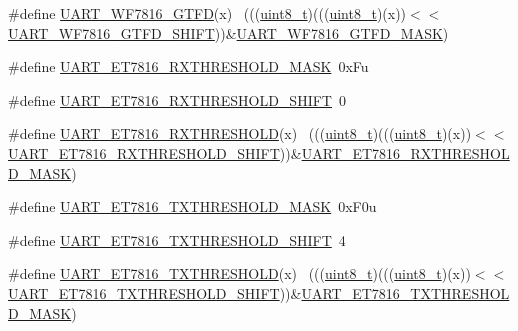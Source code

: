 \begin{DoxyCompactItemize}
\item 
\#define \hyperlink{group___u_a_r_t___register___masks_ga218200aa93c98c371375369a8b2858d9}{U\+A\+R\+T\+\_\+\+W\+F7816\+\_\+\+G\+T\+FD}(x)                                        ~(((\hyperlink{_p_e___types_8h_aba7bc1797add20fe3efdf37ced1182c5}{uint8\+\_\+t})(((\hyperlink{_p_e___types_8h_aba7bc1797add20fe3efdf37ced1182c5}{uint8\+\_\+t})(x))$<$$<$\hyperlink{group___u_a_r_t___register___masks_ga721ba0567ed0305bffa0ee30353aa2c8}{U\+A\+R\+T\+\_\+\+W\+F7816\+\_\+\+G\+T\+F\+D\+\_\+\+S\+H\+I\+FT}))\&\hyperlink{group___u_a_r_t___register___masks_gafe82535b1014fd5cc4cfd50169d743ac}{U\+A\+R\+T\+\_\+\+W\+F7816\+\_\+\+G\+T\+F\+D\+\_\+\+M\+A\+SK})
\item 
\#define \hyperlink{group___u_a_r_t___register___masks_ga9ef739359fd7d60427900938502e5100}{U\+A\+R\+T\+\_\+\+E\+T7816\+\_\+\+R\+X\+T\+H\+R\+E\+S\+H\+O\+L\+D\+\_\+\+M\+A\+SK}~0x\+Fu
\item 
\#define \hyperlink{group___u_a_r_t___register___masks_gacd8498adcff369769fb56dde33ce7465}{U\+A\+R\+T\+\_\+\+E\+T7816\+\_\+\+R\+X\+T\+H\+R\+E\+S\+H\+O\+L\+D\+\_\+\+S\+H\+I\+FT}~0
\item 
\#define \hyperlink{group___u_a_r_t___register___masks_ga2529b3862c9ed6695e520dbce4a631cf}{U\+A\+R\+T\+\_\+\+E\+T7816\+\_\+\+R\+X\+T\+H\+R\+E\+S\+H\+O\+LD}(x)                          ~(((\hyperlink{_p_e___types_8h_aba7bc1797add20fe3efdf37ced1182c5}{uint8\+\_\+t})(((\hyperlink{_p_e___types_8h_aba7bc1797add20fe3efdf37ced1182c5}{uint8\+\_\+t})(x))$<$$<$\hyperlink{group___u_a_r_t___register___masks_gacd8498adcff369769fb56dde33ce7465}{U\+A\+R\+T\+\_\+\+E\+T7816\+\_\+\+R\+X\+T\+H\+R\+E\+S\+H\+O\+L\+D\+\_\+\+S\+H\+I\+FT}))\&\hyperlink{group___u_a_r_t___register___masks_ga9ef739359fd7d60427900938502e5100}{U\+A\+R\+T\+\_\+\+E\+T7816\+\_\+\+R\+X\+T\+H\+R\+E\+S\+H\+O\+L\+D\+\_\+\+M\+A\+SK})
\item 
\#define \hyperlink{group___u_a_r_t___register___masks_ga6c3c5365dc3ba6ac54a4bd4330ff60cf}{U\+A\+R\+T\+\_\+\+E\+T7816\+\_\+\+T\+X\+T\+H\+R\+E\+S\+H\+O\+L\+D\+\_\+\+M\+A\+SK}~0x\+F0u
\item 
\#define \hyperlink{group___u_a_r_t___register___masks_ga427963f9e067b0856aa8830cae622291}{U\+A\+R\+T\+\_\+\+E\+T7816\+\_\+\+T\+X\+T\+H\+R\+E\+S\+H\+O\+L\+D\+\_\+\+S\+H\+I\+FT}~4
\item 
\#define \hyperlink{group___u_a_r_t___register___masks_ga0e12a6d9606ae3055889260cc5e0edff}{U\+A\+R\+T\+\_\+\+E\+T7816\+\_\+\+T\+X\+T\+H\+R\+E\+S\+H\+O\+LD}(x)                          ~(((\hyperlink{_p_e___types_8h_aba7bc1797add20fe3efdf37ced1182c5}{uint8\+\_\+t})(((\hyperlink{_p_e___types_8h_aba7bc1797add20fe3efdf37ced1182c5}{uint8\+\_\+t})(x))$<$$<$\hyperlink{group___u_a_r_t___register___masks_ga427963f9e067b0856aa8830cae622291}{U\+A\+R\+T\+\_\+\+E\+T7816\+\_\+\+T\+X\+T\+H\+R\+E\+S\+H\+O\+L\+D\+\_\+\+S\+H\+I\+FT}))\&\hyperlink{group___u_a_r_t___register___masks_ga6c3c5365dc3ba6ac54a4bd4330ff60cf}{U\+A\+R\+T\+\_\+\+E\+T7816\+\_\+\+T\+X\+T\+H\+R\+E\+S\+H\+O\+L\+D\+\_\+\+M\+A\+SK})
$$
\end{DoxyCompactItemize}
